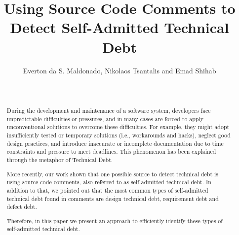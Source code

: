 \documentclass{sig-alternate}
\begin{document}

\title{Using Source Code Comments to Detect Self-Admitted Technical Debt}

\author{
\alignauthor 
       Everton da S. Maldonado, Nikolaos Tsantalis and Emad Shihab\\
       \\
       \\
}


\maketitle
\begin{abstract}
During the development and maintenance of a software system, developers face unpredictable difficulties or pressures, and in many cases are forced to apply unconventional solutions to overcome these difficulties. For example, they might adopt insufficiently tested or temporary solutions (i.e., workarounds and hacks), neglect good design practices, and introduce inaccurate or incomplete documentation due to time constraints and pressure to meet deadlines. This phenomenon has been explained through the metaphor of Technical Debt. 

More recently, our work shown that one possible source to detect technical debt is using source code comments, also referred to as self-admitted technical debt. In addition to that, we pointed out that the most common types of self-admitted technical debt found in comments are design technical debt, requirement debt and defect debt. 

Therefore, in this paper we present an approach to efficiently identify these types of self-admitted technical debt. 

\end{abstract}
\end{document}
